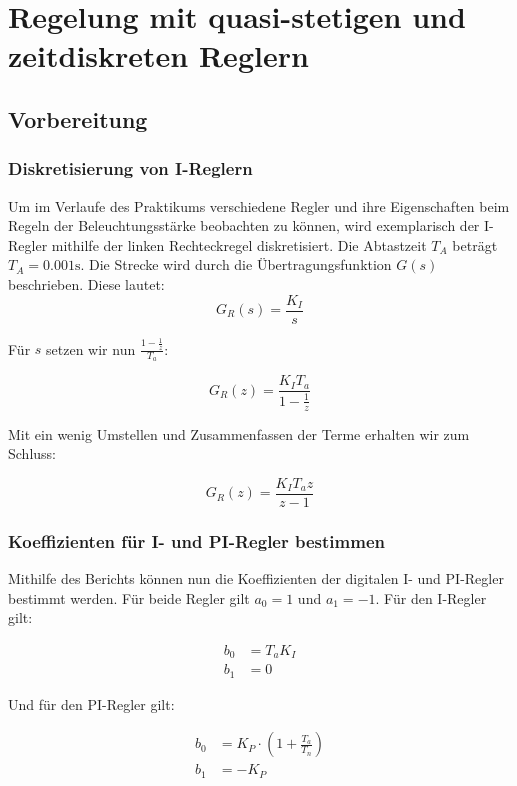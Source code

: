 \documentclass{report}
\begin{document}
\newpage

\tableofcontents

\listoffigures
\newpage
\chapter{Regelung mit quasi-stetigen und zeitdiskreten Reglern}
\section{Vorbereitung}
\subsection{Diskretisierung von I-Reglern}
\label{sec:diskr-von-i}


Um im Verlaufe des Praktikums verschiedene Regler und ihre Eigenschaften beim Regeln der Beleuchtungsstärke beobachten zu können, wird exemplarisch der I-Regler mithilfe der linken Rechteckregel diskretisiert. Die Abtastzeit $T_A$ beträgt $T_A = 0.001\mathrm{s}$. Die Strecke wird durch die Übertragungsfunktion $G(s)$ beschrieben. Diese lautet:
$$G_{R}(s) = \frac{K_{I}}{s}$$

Für $s$ setzen wir nun $\frac{1-\frac{1}{z}}{T_{a}}$:

$$G_{R}(z) = \frac{K_{I}T_{a}}{1-\frac{1}{z}}$$

Mit ein wenig Umstellen und Zusammenfassen der Terme erhalten wir zum Schluss:

$$G_{R}(z) = \frac{K_{I}T_{a}z}{z-1}$$

\subsection{Koeffizienten für I- und PI-Regler bestimmen}
\label{sec:koeffizienten-fur-i}

Mithilfe des Berichts können nun die Koeffizienten der digitalen I- und PI-Regler bestimmt werden. Für beide Regler gilt $a_{0} = 1$ und $a_{1} = -1$. Für den I-Regler gilt:

\begin{align}
	\label{eq:1}
	b_{0} & = T_{a}K_{I} \\
	b_{1} & = 0
\end{align}

Und für den PI-Regler gilt:

\begin{align}
	\label{eq:2}
	b_{0} & = K_{P} \cdot (1 + \frac{T_{a}}{T_{n}}) \\
	b_{1} & = -K_{P}
\end{align}
\end{document}
